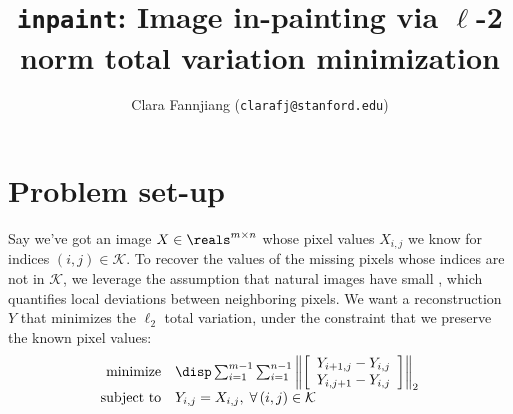 \documentclass[12pt]{article}
\title{\texttt{inpaint}: Image in-painting via $\ell$-2 norm total variation minimization}
\author{Clara Fannjiang (\texttt{clarafj@stanford.edu})}
\begin{document}
\maketitle

\section{Problem set-up}

Say we've got an image $X \in \reals^{m \times n}$ whose pixel values $X_{i, j}$ we know for indices $(i, j) \in \mathcal{K}$. To recover the values of the missing pixels whose indices are not in $\mathcal{K}$, we leverage the assumption that natural images have small , which quantifies local deviations between neighboring pixels. We want a reconstruction $Y$ that minimizes the $\ell_2$ total variation, under the constraint that we preserve the known pixel values:
$$
\begin{array}{rl}
	\text{minimize} & \disp \sum_{i = 1}^{m - 1} \sum_{i = 1}^{n - 1} \left \| \left[ 
		\begin{array}{c}
		Y_{i + 1, j} - Y_{i, j} \\
		Y_{i, j + 1} - Y_{i, j}
		\end{array}
		\right] \right \|_2 \\
	\text{subject to} & Y_{i, j} = X_{i, j}, \; \forall \, (i, j) \in \mathcal{K}
\end{array}
$$
\end{document}
